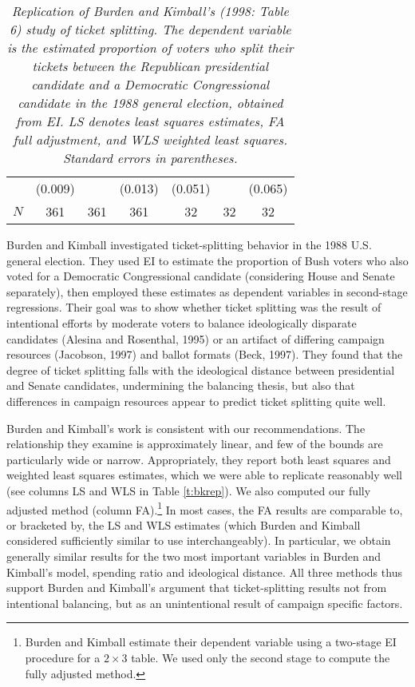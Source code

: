 \documentclass[11pt,titlepage]{article}
\begin{document}
\begin{table}[th]
\begin{center}
\begin{tabular}{lcccccc}
        &       (0.009) &               &       (0.013) &       (0.051) &               &       (0.065) \\
$N$     &       361     &       361     &       361     &       32      &       32      &       32      \\
\hline
\end{tabular}
\end{center}
\caption{\em Replication of Burden and Kimball's (1998: Table 6) study of ticket
  splitting.  The dependent variable is the estimated proportion of 
voters who split their tickets between the Republican presidential 
candidate and a Democratic Congressional candidate in the 1988 general 
election, obtained from EI.  LS denotes least squares estimates, FA 
full adjustment, and WLS weighted least squares.  Standard errors in 
parentheses.}
\end{table}

Burden and Kimball investigated ticket-splitting behavior in the 1988
U.S. general election.  They used EI to estimate the proportion of
Bush voters who also voted for a Democratic Congressional candidate
(considering House and Senate separately), then employed these
estimates as dependent variables in second-stage regressions.  Their
goal was to show whether ticket splitting was the result of
intentional efforts by moderate voters to balance ideologically
disparate candidates (Alesina and Rosenthal, 1995) or an artifact of
differing campaign resources (Jacobson, 1997) and ballot formats
(Beck, 1997).  They found that the degree of ticket splitting falls
with the ideological distance between presidential and Senate
candidates, undermining the balancing thesis, but also that
differences in campaign resources appear to predict ticket splitting
quite well.

Burden and Kimball's work is consistent with our recommendations.  The
relationship they examine is approximately linear, and few of the
bounds are particularly wide or narrow.  Appropriately, they report
both least squares and weighted least squares estimates, which we were
able to replicate reasonably well (see columns LS and WLS in Table
\ref{t:bkrep}).  We also computed our fully adjusted method (column
FA).\footnote{Burden and Kimball estimate their dependent variable
  using a two-stage EI procedure for a $2\times 3$ table.  We used
  only the second stage to compute the fully adjusted method.} In most
cases, the FA results are comparable to, or bracketed by, the LS and
WLS estimates (which Burden and Kimball considered sufficiently
similar to use interchangeably).  In particular, we obtain generally
similar results for the two most important variables in Burden and
Kimball's model, spending ratio and ideological distance.  All three
methods thus support Burden and Kimball's argument that
ticket-splitting results not from intentional balancing, but as an
unintentional result of campaign specific factors.
\end{document}

